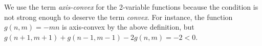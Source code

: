 \begin{remark}
  We use the term \emph{axis-convex} for the 2-variable functions
  because the condition is not strong enough to deserve the term
  \emph{convex}. For instance, the function $g(n,m) = -mn$ is
  axis-convex by the above definition, but
  $g(n+1,m+1) + g(n-1,m-1) - 2g(n,m) = -2 < 0$.
\end{remark}


